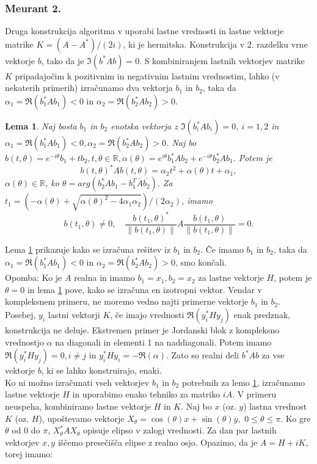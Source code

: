 \documentclass[12pt,a4paper]{amsart}
\theoremstyle{definition}
\theoremstyle{plain}
\newtheorem{lema}[definicija]{Lema}
\newcommand{\R}{\mathbb R}
\newcommand{\norm}[1]{\left\lVert#1\right\rVert}
\begin{document}
\subsubsection{Meurant 2.}
Druga konstrukcija algoritma v \cite{meurant} uporabi lastne vrednosti in lastne vektorje matrike $K=(A-A^\ast)/(2i)$, ki je hermitska. Konstrukcija v 2. razdelku vrne vektorje $b$, tako da je $\Im(b^\ast Ab)=0$. S kombiniranjem lastnih vektorjev matrike $K$ pripadajočim k pozitivnim in negativnim lastnim vrednostim, lahko (v nekaterih primerih) izračunamo dva vektorja $b_1$ in $b_2$, taka da $\alpha_1=\Re(b_1^\ast Ab_1)<0$ in $\alpha_2=\Re(b_2^\ast Ab_2)>0$. 
\begin{lema}\label{komp}
Naj bosta $b_1$ in $b_2$ enotska vektorja z $\Im(b_i^\ast Ab_i)=0$, $i=1,2$ in $\alpha_1=\Re(b_1^\ast Ab_1)<0, \alpha_2=\Re(b_2^\ast Ab_2)>0$. Naj bo $b(t,\theta)=e^{-i\theta}b_1 + tb_2, t,\theta \in \R, \alpha(\theta)=e^{i\theta}b_1^\ast Ab_2 +e^{-i\theta}b_2^\ast Ab_1.$ Potem je 
$$b(t,\theta)^\ast Ab(t,\theta)=\alpha_2 t^2 +\alpha(\theta)t+\alpha_1,$$ 
$\alpha(\theta)\in\R$, ko $\theta=arg(b_2^\ast Ab_1 -b_1^T\bar{A}\bar{b_2}).$ Za $t_1 =(-\alpha(\theta) +\sqrt{\alpha(\theta)^2 -4\alpha_1\alpha_2})/(2\alpha_2)$, imamo 
$$b(t_1, \theta) \not=0,\quad  \frac{b(t_1,\theta)^\ast}{\norm{b(t_1,\theta)}}A\frac{b(t_1,\theta)}{\norm{b(t_1,\theta)}}=0.$$
\end{lema}
Lema \ref{komp} prikazuje kako se izračuna rešitev iz $b_1$ in $b_2$. Če imamo $b_1$ in $b_2$, taka da  $\alpha_1=\Re(b_1^\ast Ab_1)<0$ in $\alpha_2=\Re(b_2^\ast Ab_2)>0$, smo končali.\\
Opomba: Ko je $A$ realna in imamo $b_1=x_1, b_2=x_2$ za lastne vektorje $H$, potem je $\theta=0$ in lema \ref{komp} pove, kako se izračuna en izotropni vektor. Vendar v kompleksnem primeru, ne moremo vedno najti primerne vektorje $b_1$ in $b_2$. Posebej, $y_i$ lastni vektorji $K$, če imajo vrednosti $\Re(y_i^\ast Hy_j)$ enak predznak, konstrukcija ne deluje. Ekstremen primer je Jordanski blok z kompleksno vrednostjo $\alpha$ na diagonali in elementi 1 na naddiagonali. Potem imamo  $\Re(y_i^\ast Hy_j)=0, i\not=j$ in $y_i^\ast Hy_i=-\Re(\alpha)$. Zato so realni deli $b^\ast Ab$ za vse vektorje $b$, ki se lahko konstruirajo, enaki.\\
Ko ni možno izračunati vseh vektorjev $b_1$ in $b_2$ potrebnih za lemo \ref{komp}, izračunamo lastne vektorje $H$ in uporabimo enako tehniko za matriko $iA$. V primeru neuspeha, kombiniramo lastne vektorje $H$ in $K$. Naj bo $x$ (oz. $y$) lastna vrednost $K$ (oz. $H$), upoštevamo vektorje $X_\theta =\cos(\theta)x+\sin(\theta)y,$ $0\le\theta\le\pi$. Ko gre $\theta$ od 0 do $\pi$, $X_\theta ^\ast AX_\theta$ opisuje elipso v zalogi vrednosti. Za dan par lastnih vektorjev $x,y$ iščemo presečišča elipse z realno osjo. Opazimo, da je $A=H+iK$, torej imamo:
\end{document}
